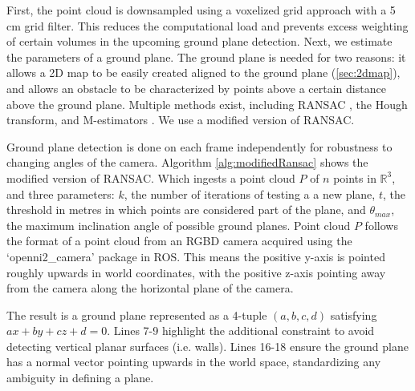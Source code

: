 First, the point cloud is downsampled using a voxelized grid approach with a 5 cm
grid filter. This reduces the computational load and prevents excess weighting of
certain volumes in the upcoming ground plane detection.
Next, we estimate the parameters of a ground plane. 
The ground plane is needed for two reasons: it allows a 2D map to be easily
created aligned to the ground plane (\autoref{sec:2dmap}), and allows an
obstacle to be characterized by points above a certain distance above
the ground plane.
Multiple methods exist, including RANSAC \cite{fischler1981random}, the Hough
transform, and M-estimators \cite{holz2013towards}. We use a modified version
of RANSAC. 

Ground plane detection is done on each frame independently for robustness to
changing angles of the camera.
Algorithm \autoref{alg:modifiedRansac} shows the modified version of RANSAC.
Which ingests a point cloud $P$ of $n$ points in $\mathbb{R}^3$, and three
parameters: $k$, the number of iterations of testing a a new plane, $t$, the
threshold in metres in which points are considered part of the plane, and
$\theta_{max}$, the maximum inclination angle of possible ground planes.
Point cloud $P$ follows the format of a point cloud from an RGBD camera acquired
using the `openni2\_camera' package in ROS. This means the positive y-axis is
pointed roughly upwards in world coordinates, with the positive z-axis pointing
away from the camera along the horizontal plane of the camera.

The result is a ground plane represented as a 4-tuple $(a,b,c,d)$ satisfying
$ax + by + cz + d = 0$. Lines 7-9 highlight the additional constraint to avoid
detecting vertical planar surfaces (i.e. walls). Lines 16-18 ensure the ground
plane has a normal vector pointing upwards in the world space, standardizing any
ambiguity in defining a plane.

